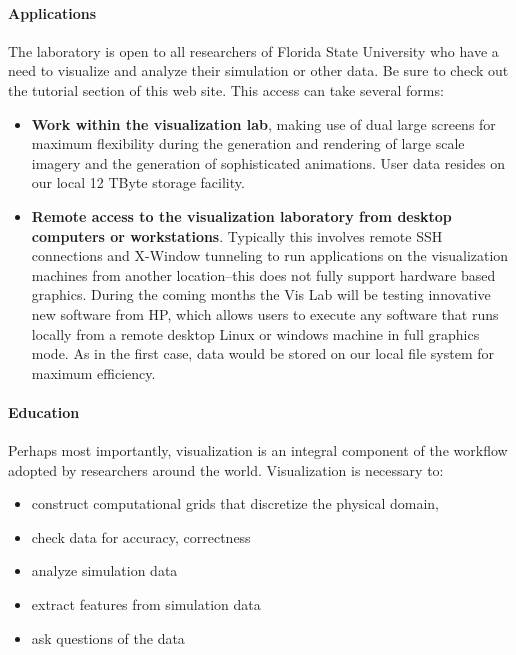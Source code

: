 \documentclass[12pt,a4paper]{article}
\begin{document}
\paragraph{Applications}
The laboratory is open to all researchers of Florida State University who have a need to visualize and analyze their simulation or other data. Be sure to check out the tutorial section of this web site. This access can take several forms:
\begin{itemize}
    \item \textbf{Work within the visualization lab}, making use of dual large screens for maximum flexibility during the generation and rendering of large scale imagery and the generation of sophisticated animations. User data resides on our local 12 TByte storage facility.
    \item \textbf{Remote access to the visualization laboratory from desktop computers or workstations}. Typically this involves remote SSH connections and X-Window tunneling to run applications on the visualization machines from another location--this does not fully support hardware based graphics. During the coming months the Vis Lab will be testing innovative new software from HP, which allows users to execute any software that runs locally from a remote desktop Linux or windows machine in full graphics mode. As in the first case, data would be stored on our local file system for maximum efficiency.
\end{itemize}

\paragraph{Education}
Perhaps most importantly, visualization is an integral component of the workflow adopted by researchers around the world. Visualization is necessary to:
\begin{itemize}
    \item construct computational grids that discretize the physical domain,
    \item check data for accuracy, correctness
    \item analyze simulation data
    \item extract features from simulation data
    \item ask questions of the data
\end{itemize}
\end{document}
